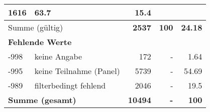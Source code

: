 \begin{longtable}{lXrrr}
       \num{1616} &
       \num[round-mode=places,round-precision=2]{63.7} &
         \num[round-mode=places,round-precision=2]{15.4} \\
     \midrule
     \multicolumn{2}{l}{Summe (gültig)} &
       \textbf{\num{2537}} &
     \textbf{\num{100}} &
       \textbf{\num[round-mode=places,round-precision=2]{24.18}} \\
     \multicolumn{5}{l}{\textbf{Fehlende Werte}}\\
       -998 &
       keine Angabe &
         \num{172} &
        - &
         \num[round-mode=places,round-precision=2]{1.64} \\
       -995 &
       keine Teilnahme (Panel) &
         \num{5739} &
        - &
         \num[round-mode=places,round-precision=2]{54.69} \\
       -989 &
       filterbedingt fehlend &
         \num{2046} &
        - &
         \num[round-mode=places,round-precision=2]{19.5} \\
     \midrule
     \multicolumn{2}{l}{\textbf{Summe (gesamt)}} &
          \textbf{\num{10494}} &
        \textbf{-} &
        \textbf{\num{100}} \\
     \bottomrule
     \end{longtable}
     
